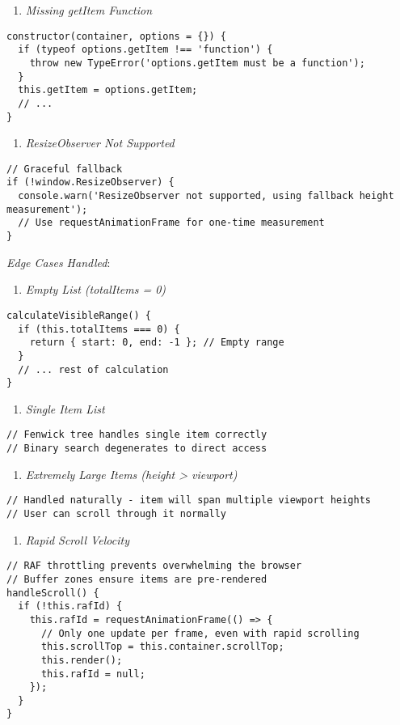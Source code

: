 \documentclass[11pt]{article}
\begin{document}
\begin{enumerate}
\item \emph{Missing getItem Function}
\end{enumerate}
\begin{verbatim}
constructor(container, options = {}) {
  if (typeof options.getItem !== 'function') {
    throw new TypeError('options.getItem must be a function');
  }
  this.getItem = options.getItem;
  // ...
}
\end{verbatim}

\begin{enumerate}
\item \emph{ResizeObserver Not Supported}
\end{enumerate}
\begin{verbatim}
// Graceful fallback
if (!window.ResizeObserver) {
  console.warn('ResizeObserver not supported, using fallback height measurement');
  // Use requestAnimationFrame for one-time measurement
}
\end{verbatim}

\emph{Edge Cases Handled}:

\begin{enumerate}
\item \emph{Empty List (totalItems = 0)}
\end{enumerate}
\begin{verbatim}
calculateVisibleRange() {
  if (this.totalItems === 0) {
    return { start: 0, end: -1 }; // Empty range
  }
  // ... rest of calculation
}
\end{verbatim}

\begin{enumerate}
\item \emph{Single Item List}
\end{enumerate}
\begin{verbatim}
// Fenwick tree handles single item correctly
// Binary search degenerates to direct access
\end{verbatim}

\begin{enumerate}
\item \emph{Extremely Large Items (height > viewport)}
\end{enumerate}
\begin{verbatim}
// Handled naturally - item will span multiple viewport heights
// User can scroll through it normally
\end{verbatim}

\begin{enumerate}
\item \emph{Rapid Scroll Velocity}
\end{enumerate}
\begin{verbatim}
// RAF throttling prevents overwhelming the browser
// Buffer zones ensure items are pre-rendered
handleScroll() {
  if (!this.rafId) {
    this.rafId = requestAnimationFrame(() => {
      // Only one update per frame, even with rapid scrolling
      this.scrollTop = this.container.scrollTop;
      this.render();
      this.rafId = null;
    });
  }
}
\end{verbatim}
\end{document}
